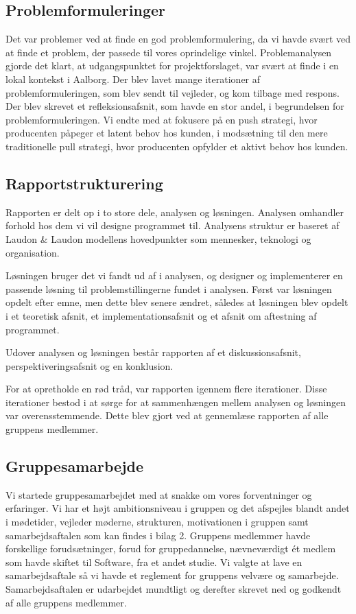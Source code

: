 \documentclass[a4paper,12pt,oneside]{article}
\begin{document}
\subsection{Problemformuleringer}

Det var problemer ved at finde en god problemformulering, da vi havde svært ved at finde et problem, der passede til vores oprindelige vinkel. Problemanalysen gjorde det klart, at udgangspunktet for projektforslaget, var svært at finde i en lokal kontekst i Aalborg. Der blev lavet mange iterationer af problemformuleringen, som blev sendt til vejleder, og kom tilbage med respons. Der blev skrevet et refleksionsafsnit, som havde en stor andel, i begrundelsen for problemformuleringen. Vi endte med at fokusere på en push strategi, hvor producenten påpeger et latent behov hos kunden, i modsætning til den mere traditionelle pull strategi, hvor producenten opfylder et aktivt behov hos kunden.

\subsection{Rapportstrukturering}
Rapporten er delt op i to store dele, analysen og løsningen. Analysen omhandler forhold hos dem vi vil designe programmet til. Analysens struktur er baseret af Laudon \& Laudon modellens hovedpunkter som mennesker, teknologi og organisation.

Løsningen bruger det vi fandt ud af i analysen, og designer og implementerer en passende løsning til problemstillingerne fundet i analysen. Først var løsningen opdelt efter emne, men dette blev senere ændret, således at løsningen blev opdelt i et teoretisk afsnit, et implementationsafsnit og et afsnit om aftestning af programmet.

Udover analysen og løsningen består rapporten af et diskussionsafsnit, perspektiveringsafsnit og en konklusion.

For at opretholde en rød tråd, var rapporten igennem flere iterationer. Disse iterationer bestod i at sørge for at sammenhængen mellem analysen og løsningen var overensstemmende. Dette blev gjort ved at gennemlæse rapporten af alle gruppens medlemmer.

\subsection{Gruppesamarbejde}

Vi startede gruppesamarbejdet med at snakke om vores forventninger og erfaringer. Vi har et højt ambitionsniveau i gruppen og det afspejles blandt andet i mødetider, vejleder møderne, strukturen, motivationen i gruppen samt samarbejdsaftalen som kan findes i bilag 2. Gruppens medlemmer havde forskellige forudsætninger, forud for gruppedannelse, nævneværdigt ét medlem som havde skiftet til Software, fra et andet studie. Vi valgte at lave en samarbejdsaftale så vi havde et reglement for gruppens velvære og samarbejde. Samarbejdsaftalen er udarbejdet mundtligt og derefter skrevet ned og godkendt af alle gruppens medlemmer.
\end{document}
